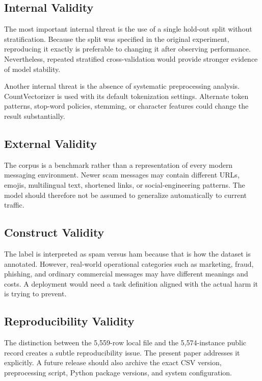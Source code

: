 \documentclass[conference]{IEEEtran}
\begin{document}
\subsection{Internal Validity}
The most important internal threat is the use of a single hold-out split without stratification. Because the split was specified in the original experiment, reproducing it exactly is preferable to changing it after observing performance. Nevertheless, repeated stratified cross-validation would provide stronger evidence of model stability.

Another internal threat is the absence of systematic preprocessing analysis. CountVectorizer is used with its default tokenization settings. Alternate token patterns, stop-word policies, stemming, or character features could change the result substantially.

\subsection{External Validity}
The corpus is a benchmark rather than a representation of every modern messaging environment. Newer scam messages may contain different URLs, emojis, multilingual text, shortened links, or social-engineering patterns. The model should therefore not be assumed to generalize automatically to current traffic.

\subsection{Construct Validity}
The label is interpreted as spam versus ham because that is how the dataset is annotated. However, real-world operational categories such as marketing, fraud, phishing, and ordinary commercial messages may have different meanings and costs. A deployment would need a task definition aligned with the actual harm it is trying to prevent.

\subsection{Reproducibility Validity}
The distinction between the 5,559-row local file and the 5,574-instance public record creates a subtle reproducibility issue. The present paper addresses it explicitly. A future release should also archive the exact CSV version, preprocessing script, Python package versions, and system configuration.
\end{document}
